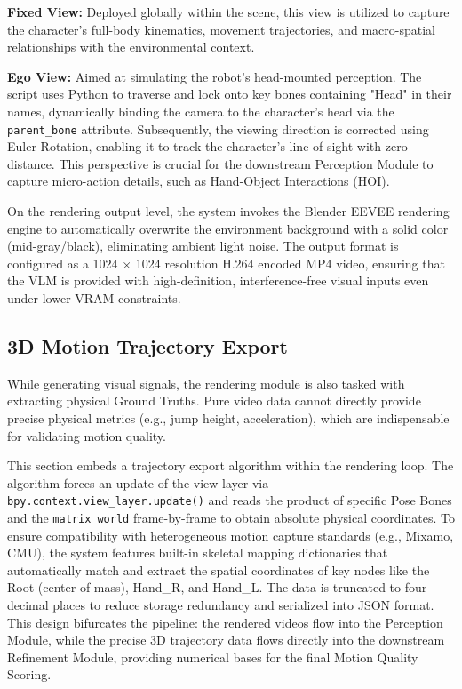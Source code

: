\documentclass[11pt,oneside]{report}
\begin{document}
\textbf{Fixed View:} Deployed globally within the scene, this view is utilized to capture the character's full-body kinematics, movement trajectories, and macro-spatial relationships with the environmental context.

\textbf{Ego View:} Aimed at simulating the robot's head-mounted perception. The script uses Python to traverse and lock onto key bones containing "Head" in their names, dynamically binding the camera to the character's head via the \texttt{parent\_bone} attribute. Subsequently, the viewing direction is corrected using Euler Rotation, enabling it to track the character's line of sight with zero distance. This perspective is crucial for the downstream Perception Module to capture micro-action details, such as Hand-Object Interactions (HOI).

On the rendering output level, the system invokes the Blender EEVEE rendering engine to automatically overwrite the environment background with a solid color (mid-gray/black), eliminating ambient light noise. The output format is configured as a 1024 $\times$ 1024 resolution H.264 encoded MP4 video, ensuring that the VLM is provided with high-definition, interference-free visual inputs even under lower VRAM constraints.

\subsection{3D Motion Trajectory Export}
While generating visual signals, the rendering module is also tasked with extracting physical Ground Truths. Pure video data cannot directly provide precise physical metrics (e.g., jump height, acceleration), which are indispensable for validating motion quality.

This section embeds a trajectory export algorithm within the rendering loop. The algorithm forces an update of the view layer via \texttt{bpy.context.view\_layer.update()} and reads the product of specific Pose Bones and the \texttt{matrix\_world} frame-by-frame to obtain absolute physical coordinates. To ensure compatibility with heterogeneous motion capture standards (e.g., Mixamo, CMU), the system features built-in skeletal mapping dictionaries that automatically match and extract the spatial coordinates of key nodes like the Root (center of mass), Hand\_R, and Hand\_L. The data is truncated to four decimal places to reduce storage redundancy and serialized into JSON format. This design bifurcates the pipeline: the rendered videos flow into the Perception Module, while the precise 3D trajectory data flows directly into the downstream Refinement Module, providing numerical bases for the final Motion Quality Scoring.
\end{document}
